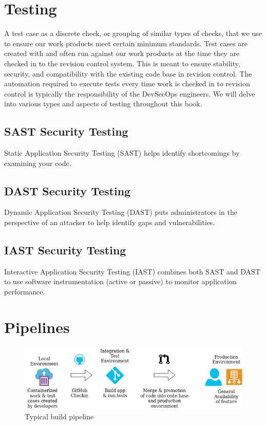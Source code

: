 \section{Testing}

\justify{}
A test case as a discrete check, or grouping of similar types of checks,
that we use to ensure our work products meet certain minimum standards. Test cases are created with
and often run against our work products at the time they are checked in to the revision control system.
This is meant to ensure stability, security, and compatibility with the existing code base in revision
control. The automation required to execute tests every time work is checked in to
revision control is typically the responsibility of the DevSecOps engineers. We will delve into various
types and aspects of testing throughout this book. 

\subsection{SAST Security Testing}
Static Application Security Testing (SAST) helps identify shortcomings by examining your code.

\subsection{DAST Security Testing}
Dynamic Application Security Testing (DAST) puts administrators in the perspective of
an attacker to help identify gaps and vulnerabilities.

\subsection{IAST Security Testing}
Interactive Application Security Testing (IAST) combines both SAST and DAST to use software
instrumentation (active or passive) to monitor application performance.

\section{Pipelines}

\begin{figure}[!htb]
\centering
\includegraphics[scale=0.63]{../images/flow.png}
\caption{Typical build pipeline}
\label{pipeline}
\end{figure}


